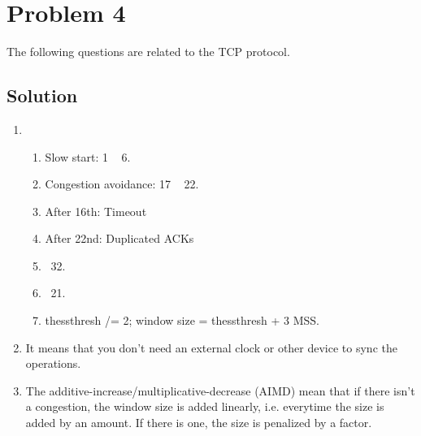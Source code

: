 
\section*{Problem 4}

The following questions are related to the TCP protocol.

\subsection*{Solution}

\begin{enumerate}
    \item \begin{enumerate}
              \item Slow start: 1 ~ 6.
              \item Congestion avoidance: 17 ~ 22.
              \item After 16th: Timeout
              \item After 22nd: Duplicated ACKs
              \item ~32.
              \item ~21.
              \item thessthresh /= 2; window size = thessthresh + 3 MSS.
          \end{enumerate}

    \item It means that you don't need an external clock or other device to sync the operations.
    \item The additive-increase/multiplicative-decrease (AIMD) mean that if there isn't a congestion, the window size is added linearly, i.e. everytime the size is added by an amount.
          If there is one, the size is penalized by a factor.
\end{enumerate}
